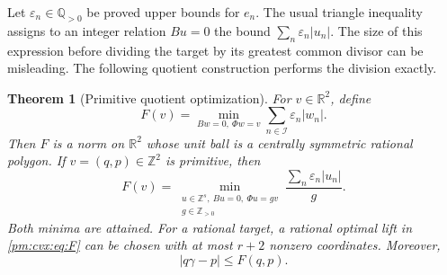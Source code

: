 \documentclass[11pt,a4paper]{article}
\newcommand{\Q}{\mathbb Q}
\newcommand{\R}{\mathbb R}
\newcommand{\Z}{\mathbb Z}
\newtheorem{theorem}{Theorem}[section]
\theoremstyle{definition}
\theoremstyle{remark}
\numberwithin{equation}{section}
\begin{document}
Let $\varepsilon_n\in\Q_{>0}$ be proved upper bounds for $e_n$.
The usual triangle inequality assigns to an integer relation $Bu=0$ the
bound $\sum_n\varepsilon_n|u_n|$.  The size of this expression before
dividing the target by its greatest common divisor can be misleading.
The following quotient construction performs the division exactly.

\begin{theorem}[Primitive quotient optimization]\label{pm:cvx:thm:primitive}
For $v\in\R^2$, define
\begin{equation}\label{pm:cvx:eq:F}
 F(v)=\min_{Bw=0,\ \Phi w=v}\sum_{n\in\mathcal I}
             \varepsilon_n|w_n|.
\end{equation}
Then $F$ is a norm on $\R^2$ whose unit ball is a centrally symmetric
rational polygon.  If $v=(q,p)\in\Z^2$ is primitive, then
\begin{equation}\label{pm:cvx:eq:primitive-equality}
 F(v)=
 \min_{\substack{u\in\Z^s,\ Bu=0,\ \Phi u=gv\\g\in\Z_{>0}}}
       \frac{\sum_n\varepsilon_n|u_n|}{g}.
\end{equation}
Both minima are attained.  For a rational target, a rational optimal lift in
\eqref{pm:cvx:eq:F} can be chosen with at most $r+2$ nonzero coordinates.
Moreover,
\begin{equation}\label{pm:cvx:eq:F-error}
 |q\gamma-p|\le F(q,p).
\end{equation}
\end{theorem}
\end{document}
